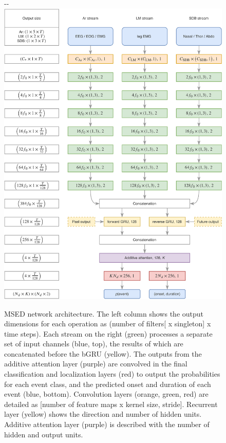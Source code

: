 \begin{figure}[tbp]
    \centering
    \begin{adjustwidth*}{}{-\marginparwidth-\marginparsep}
    \includegraphics[width=\linewidth]{figures/paper-vi/msed_architecture.pdf}
    \caption[\acs{MSED} network architecture]{\acs{MSED} network architecture. The left column shows the output dimensions for each operation as (number of filters[ x singleton] x time steps). Each stream on the right (green) processes a separate set of input channels (blue, top), the results of which are concatenated before the \ac{bGRU} (yellow). The outputs from the additive attention layer (purple) are convolved in the final classification and localization layers (red) to output the probabilities for each event class, and the predicted onset and duration of each event (blue, bottom). Convolution layers (orange, green, red) are detailed as [number of feature maps x kernel size, stride]. Recurrent layer (yellow) shows the direction and number of hidden units. Additive attention layer (purple) is described with the number of hidden and output units.}
    \label{fig:event-detection:paper-vi:architecture}
    \end{adjustwidth*}
\end{figure}

